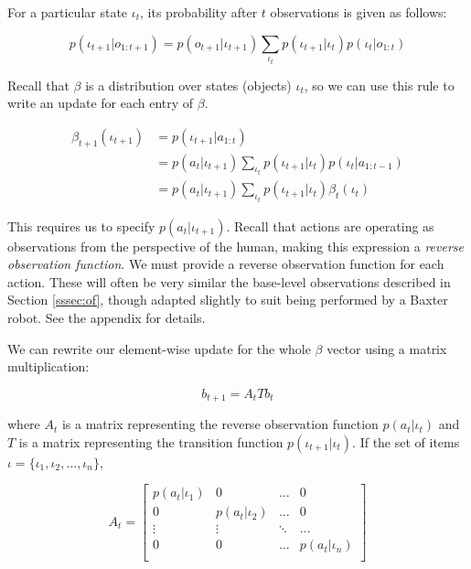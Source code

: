 \documentclass{article}
\begin{document}
\begin{multicols}{2}
For a particular state $\iota_t$, its probability after $t$ observations is given as follows: 

\begin{equation*}
	p(\iota_{t+1} | o_{1:t+1}) = p(o_{t+1} | \iota_{t+1}) \sum_{\iota_{t}} p(\iota_{t+1} | \iota_{t}) p (\iota_{t} | o_{1:t})
\end{equation*}

Recall that $\beta$ is a distribution over states (objects) $\iota_t$, so we can use this rule to write an update for each entry of $\beta$. 

\begin{align*}
	\beta_{t+1}(\iota_{t+1})&= p(\iota_{t+1} | a_{1:t})  \\
	&= p(a_{t} | \iota_{t+1}) \sum_{\iota_{t}} p(\iota_{t+1} | \iota_{t}) p (\iota_{t} | a_{1:t-1}) \\ 
	&= p(a_{t} | \iota_{t+1}) \sum_{\iota_{t}} p(\iota_{t+1} | \iota_{t}) \beta_{t}(\iota_{t}) 
\end{align*}

This requires us to specify $p(a_{t} | \iota_{t+1})$. Recall that actions are operating as observations from the perspective of the human, making this expression a \emph{reverse observation function}. We must provide a reverse observation function for each action. These will often be very similar the base-level observations described in Section \ref{sssec:of}, though adapted slightly to suit being performed by a Baxter robot. See the appendix for details. 


We can rewrite our element-wise update for the whole $\beta$ vector using a matrix multiplication: 


$$b_{t+1} = A_{t}T b_{t}$$


where $A_{t}$ is a matrix representing the reverse observation function $p(a_{t} | \iota_t)$ and $T$ is a matrix representing the transition function $p(\iota_{t+1}|\iota_{t})$.  If the set of items $\mathcal{\iota} = \{ \iota_1, \iota_2, \ldots, \iota_n\}$, 

\begin{equation}
	A_{t} = \left[\begin{matrix} 
		p(a_{t} | \iota_1) & 0 & \ldots & 0 \\
		0 & p(a_{t} | \iota_2) & \ldots & 0 \\
		\vdots & \vdots & \ddots & \ldots  \\
		0 & 0 & \ldots  &  p(a_{t} | \iota_n) \\
	\end{matrix}
\right]
\end{equation}
		

\end{multicols}
\end{document}

